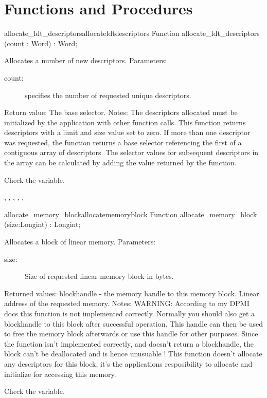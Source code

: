 \section{Functions and Procedures}
\begin{functionl}{allocate\_ldt\_descriptors}{allocateldtdescriptors}
\Declaration
Function allocate\_ldt\_descriptors (count : Word) : Word;

\Description
Allocates a number of new descriptors.
Parameters: 
\begin{description}
\item[count:\ ] specifies the number of requested unique descriptors.
\end{description}
Return value: The base selector.
Notes: The descriptors allocated must be initialized by the application with
other function calls. This function returns descriptors with a limit and
size value set to zero. If more than one descriptor was requested, the
function returns a base selector referencing the first of a contiguous array
of descriptors. The selector values for subsequent descriptors in the array
can be calculated by adding the value returned by the
function.

\Errors
 Check the  variable. 
\SeeAlso

,
,
,
,
,

\end{functionl}
\begin{functionl}{allocate\_memory\_block}{allocatememoryblock}
\Declaration
Function allocate\_memory\_block (size:Longint) : Longint;

\Description
Allocates a block of linear memory.
Parameters: 
\begin{description}
\item[size:\ ] Size of requested linear memory block in bytes.
\end{description}
Returned values: blockhandle - the memory handle to this memory block. Linear
address of the requested memory.
Notes: WARNING: According to my DPMI docs this function is not implemented
correctly. Normally you should also get a blockhandle to this block after
successful operation. This handle can then be used to free the memory block
afterwards or use this handle for other purposes. Since the function isn't
implemented correctly, and doesn't return a blockhandle, the block can't be
deallocated and is hence unusuable !
This function doesn't allocate any descriptors for this block, it's the
applications resposibility to allocate and initialize for accessing this
memory.

\Errors
 Check the  variable.
\SeeAlso
\end{functionl}
